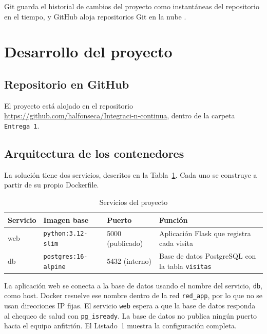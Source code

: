 \documentclass[stu,a4paper,floatsintext]{apa7}
\begin{document}
Git guarda el historial de cambios del proyecto como instantáneas del repositorio en el tiempo, y GitHub aloja repositorios Git en la nube \parencite{oliveros_repositorios, github_docs}.

\newpage
\section{Desarrollo del proyecto}

\subsection{Repositorio en GitHub}

El proyecto está alojado en el repositorio \url{https://github.com/halfonseca/Integraci-n-continua}, dentro de la carpeta \texttt{Entrega 1}.

\subsection{Arquitectura de los contenedores}

La solución tiene dos servicios, descritos en la Tabla~\ref{tab:servicios}. Cada uno se construye a partir de su propio Dockerfile.

\begin{table}[ht]
\centering
\caption{Servicios del proyecto}
\label{tab:servicios}
\begin{tabular}{@{}p{1.5cm}p{4.9cm}p{2.9cm}p{4.9cm}@{}}
\toprule
Servicio & Imagen base & Puerto & Función \\
\midrule
web & \texttt{python:3.12-slim} & 5000 (publicado) & Aplicación Flask que registra cada visita \\
db & \texttt{postgres:16-alpine} & 5432 (interno) & Base de datos PostgreSQL con la tabla \texttt{visitas} \\
\bottomrule
\end{tabular}
\end{table}

La aplicación web se conecta a la base de datos usando el nombre del servicio, \texttt{db}, como host. Docker resuelve ese nombre dentro de la red \texttt{red\_app}, por lo que no se usan direcciones IP fijas. El servicio \texttt{web} espera a que la base de datos responda al chequeo de salud con \texttt{pg\_isready}. La base de datos no publica ningún puerto hacia el equipo anfitrión. El Listado~1 muestra la configuración completa.
\end{document}
